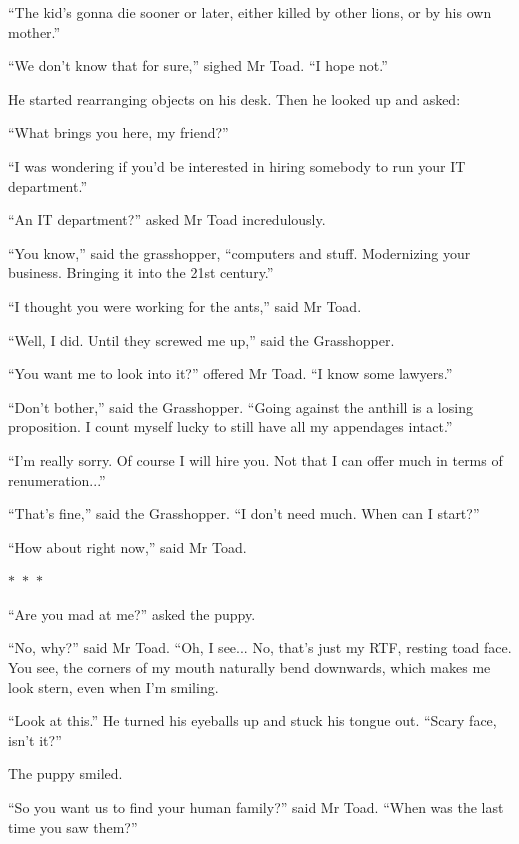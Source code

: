 \documentclass{memoir}
\newcommand{\starbreak}{%
\begin{center}
  $\ast$~$\ast$~$\ast$
\end{center}
}
\begin{document}
``The kid's gonna die sooner or later, either killed by other lions, or by his own mother.''

``We don't know that for sure,'' sighed Mr Toad. ``I hope not.''

He started rearranging objects on his desk. Then he looked up and asked:

``What brings you here, my friend?''

``I was wondering if you'd be interested in hiring somebody to run your IT department.''

``An IT department?'' asked Mr Toad incredulously.

``You know,'' said the grasshopper, ``computers and stuff. Modernizing your business. Bringing it into the 21st century.''

``I thought you were working for the ants,'' said Mr Toad.

``Well, I did. Until they screwed me up,'' said the Grasshopper. 

``You want me to look into it?'' offered Mr Toad. ``I know some lawyers.''

``Don't bother,'' said the Grasshopper. ``Going against the anthill is a losing proposition. I count myself lucky to still have all my appendages intact.''

``I'm really sorry. Of course I will hire you. Not that I can offer much in terms of renumeration...''

``That's fine,'' said the Grasshopper. ``I don't need much. When can I start?''

``How about right now,'' said Mr Toad. 

\starbreak


``Are you mad at me?'' asked the puppy.

``No, why?'' said Mr Toad. ``Oh, I see... No, that's just my RTF, resting toad face. You see, the corners of my mouth naturally bend downwards, which makes me look stern, even when I'm smiling. 

``Look at this.'' He turned his eyeballs up and stuck his tongue out. ``Scary face, isn't it?''

The puppy smiled.

``So you want us to find your human family?'' said Mr Toad. ``When was the last time you saw them?''
\end{document}
